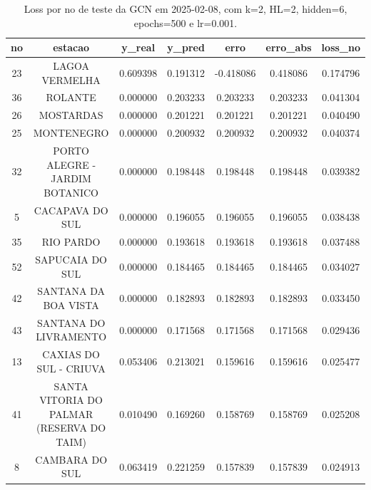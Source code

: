 \begin{table}[h]
\centering
\caption{Loss por no de teste da GCN em 2025-02-08, com k=2, HL=2, hidden=6, epochs=500 e lr=0.001.}
\label{tab:gcn_loss_k2_hl2_h6_e500_d20250208}
\begin{tabular}{ccccccc}
\toprule
no & estacao & y\_real & y\_pred & erro & erro\_abs & loss\_no \\
\midrule
23 & LAGOA VERMELHA & 0.609398 & 0.191312 & -0.418086 & 0.418086 & 0.174796 \\
36 & ROLANTE & 0.000000 & 0.203233 & 0.203233 & 0.203233 & 0.041304 \\
26 & MOSTARDAS & 0.000000 & 0.201221 & 0.201221 & 0.201221 & 0.040490 \\
25 & MONTENEGRO & 0.000000 & 0.200932 & 0.200932 & 0.200932 & 0.040374 \\
32 & PORTO ALEGRE - JARDIM BOTANICO & 0.000000 & 0.198448 & 0.198448 & 0.198448 & 0.039382 \\
5 & CACAPAVA DO SUL & 0.000000 & 0.196055 & 0.196055 & 0.196055 & 0.038438 \\
35 & RIO PARDO & 0.000000 & 0.193618 & 0.193618 & 0.193618 & 0.037488 \\
52 & SAPUCAIA DO SUL & 0.000000 & 0.184465 & 0.184465 & 0.184465 & 0.034027 \\
42 & SANTANA DA BOA VISTA & 0.000000 & 0.182893 & 0.182893 & 0.182893 & 0.033450 \\
43 & SANTANA DO LIVRAMENTO & 0.000000 & 0.171568 & 0.171568 & 0.171568 & 0.029436 \\
13 & CAXIAS DO SUL - CRIUVA & 0.053406 & 0.213021 & 0.159616 & 0.159616 & 0.025477 \\
41 & SANTA VITORIA DO PALMAR (RESERVA DO TAIM) & 0.010490 & 0.169260 & 0.158769 & 0.158769 & 0.025208 \\
8 & CAMBARA DO SUL & 0.063419 & 0.221259 & 0.157839 & 0.157839 & 0.024913 \\
\bottomrule
\end{tabular}
\end{table}
